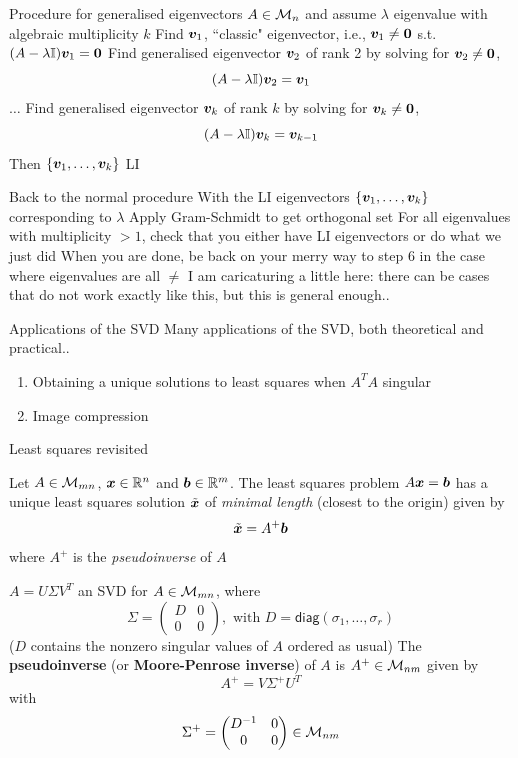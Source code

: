 \documentclass[aspectratio=169]{beamer}\usepackage[]{graphicx}\usepackage[]{xcolor}
\begin{document}
\begin{frame}{Procedure for generalised eigenvectors}
$A\in\mathcal{M}_n$ and assume $\lambda$ eigenvalue with algebraic multiplicity $k$
\vfill
Find $\bm{v}_1$, ``classic" eigenvector, i.e., $\bv_1\neq\b0$ s.t. $(A-\lambda\II)\bv_1=\b0$
\vfill
Find generalised eigenvector $\bm{v}_2$ of rank 2 by solving for $\bv_2\neq\b0$,
\[
(A-\lambda\mathbb{I})\bm{v}_2 = \bm{v}_1
\]
$\ldots$
\vfill
Find generalised eigenvector $\bm{v}_k$ of rank $k$ by solving for $\bv_k\neq\b0$,
\[
(A-\lambda\mathbb{I})\bm{v}_k = \bm{v}_{k-1}
\]
\vfill
Then $\{\bm{v}_1,\ldots,\bm{v}_k\}$ LI
\end{frame}


\begin{frame}{Back to the normal procedure}
With the LI eigenvectors $\{\bm{v}_1,\ldots,\bm{v}_k\}$ corresponding to $\lambda$
\vfill
Apply Gram-Schmidt to get orthogonal set
\vfill
For all eigenvalues with multiplicity $>1$, check that you either have LI eigenvectors or do what we just did
\vfill
When you are done, be back on your merry way to step 6 in the case where eigenvalues are all $\neq$
\vfill
I am caricaturing a little here: there can be cases that do not work exactly like this, but this is general enough..
\end{frame}

\begin{frame}{Applications of the SVD}
Many applications of the SVD, both theoretical and practical..
\vfill
\begin{enumerate}
\item Obtaining a unique solutions to least squares when $A^TA$ singular
\item Image compression
\end{enumerate}
\end{frame}


\begin{frame}{Least squares revisited}
\begin{theorem}
Let $A\in\mathcal{M}_{mn}$, $\bm{x}\in\mathbb{R}^n$ and $\bm{b}\in\mathbb{R}^m$. The least squares problem $A\bm{x}=\bm{b}$ has a unique least squares solution $\tilde{\bm{x}}$ of \emph{minimal length} (closest to the origin) given by
\[
\tilde{\bm{x}} = A^+\bm{b}
\]
where $A^+$ is the \emph{pseudoinverse} of $A$
\end{theorem}
\end{frame}

\begin{frame}
\begin{definition}[Pseudoinverse]
$A=U\Sigma V^T$ an SVD for $A\in\mathcal{M}_{mn}$, where 
\[
\Sigma = \begin{pmatrix}
D & 0 \\ 0 & 0
\end{pmatrix},
\textrm{ with }
D=\mathsf{diag}(\sigma_1,\ldots,\sigma_r)
\]
($D$ contains the nonzero singular values of $A$ ordered as usual)
\vskip0.5cm
The \textbf{pseudoinverse} (or \textbf{Moore-Penrose inverse}) of $A$ is $A^+\in\mathcal{M}_{nm}$ given by
\[
A^+ = V\Sigma^+ U^T
\]
with
\[
\Sigma^+ =
\begin{pmatrix}
D^{-1} & 0 \\ 0 & 0
\end{pmatrix}\in\mathcal{M}_{nm}
\]
\end{definition}
\end{frame}
\end{document}
